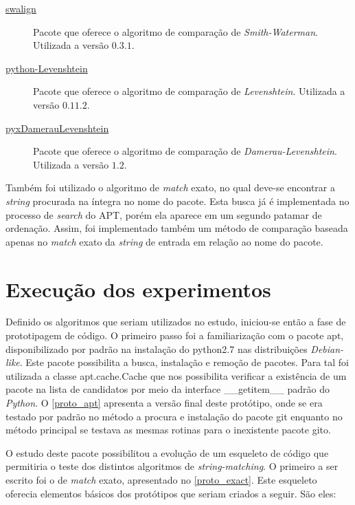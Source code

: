 \begin{description}
	\item [\href{https://pypi.python.org/pypi/swalign/}{swalign}]
	Pacote que oferece o algoritmo de comparação de \textit{Smith-Waterman}. Utilizada a versão $0.3.1$.
	\item [\href{https://pypi.python.org/pypi/python-Levenshtein/}{python-Levenshtein}]
	Pacote que oferece o algoritmo de comparação de \textit{Levenshtein}. Utilizada a versão $0.11.2$.
	\item [\href{https://pypi.python.org/pypi/pyxDamerauLevenshtein/}{pyxDamerauLevenshtein}]
	Pacote que oferece o algoritmo de comparação de \textit{Damerau-Levenshtein}. Utilizada a versão $1.2$.
\end{description}

Também foi utilizado o algoritmo de \textit{match} exato, no qual deve-se encontrar a \textit{string} procurada na íntegra no nome do pacote. Esta busca já é implementada no processo de \textit{search} do APT, porém ela aparece em um segundo patamar de ordenação. Assim, foi implementado também um método de comparação baseada apenas no \textit{match} exato  da \textit{string} de entrada em relação ao nome do pacote.


\section{Execução dos experimentos}

Definido os algoritmos que seriam utilizados no estudo, iniciou-se então a fase de prototipagem de código. O primeiro passo foi a familiarização com o pacote {\code apt}, disponibilizado por padrão na instalação do {\code python2.7} nas distribuições \textit{Debian-like}. Este pacote possibilita a busca, instalação e remoção de pacotes. Para tal foi utilizada a classe {\code apt.cache.Cache} que nos possibilita verificar a existência de um pacote na lista de candidatos por meio da interface {\code \_\_getitem\_\_} padrão do \textit{Python}. O \autoref{proto_apt} apresenta a versão final deste protótipo, onde se era testado por padrão no método a procura e instalação do pacote {\code git} enquanto no método principal se testava as mesmas rotinas para o inexistente pacote {\code gito}.



O estudo deste pacote possibilitou a evolução de um esqueleto de código que permitiria o teste dos distintos algoritmos de \textit{string-matching}. O primeiro a ser escrito foi o de \textit{match} exato, apresentado no \autoref{proto_exact}. Este esqueleto oferecia elementos básicos dos protótipos que seriam criados a seguir. São eles:

